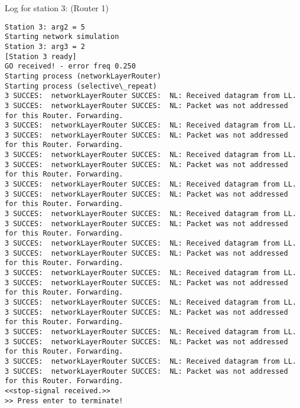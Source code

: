 Log for station 3: (Router 1)
\begin{lstlisting}[breaklines=true]
Station 3: arg2 = 5
Starting network simulation
Station 3: arg3 = 2
[Station 3 ready]
GO received! - error freq 0.250
Starting process (networkLayerRouter)
Starting process (selective\_repeat)
3 SUCCES:  networkLayerRouter SUCCES:  NL: Received datagram from LL.
3 SUCCES:  networkLayerRouter SUCCES:  NL: Packet was not addressed for this Router. Forwarding.
3 SUCCES:  networkLayerRouter SUCCES:  NL: Received datagram from LL.
3 SUCCES:  networkLayerRouter SUCCES:  NL: Packet was not addressed for this Router. Forwarding.
3 SUCCES:  networkLayerRouter SUCCES:  NL: Received datagram from LL.
3 SUCCES:  networkLayerRouter SUCCES:  NL: Packet was not addressed for this Router. Forwarding.
3 SUCCES:  networkLayerRouter SUCCES:  NL: Received datagram from LL.
3 SUCCES:  networkLayerRouter SUCCES:  NL: Packet was not addressed for this Router. Forwarding.
3 SUCCES:  networkLayerRouter SUCCES:  NL: Received datagram from LL.
3 SUCCES:  networkLayerRouter SUCCES:  NL: Packet was not addressed for this Router. Forwarding.
3 SUCCES:  networkLayerRouter SUCCES:  NL: Received datagram from LL.
3 SUCCES:  networkLayerRouter SUCCES:  NL: Packet was not addressed for this Router. Forwarding.
3 SUCCES:  networkLayerRouter SUCCES:  NL: Received datagram from LL.
3 SUCCES:  networkLayerRouter SUCCES:  NL: Packet was not addressed for this Router. Forwarding.
3 SUCCES:  networkLayerRouter SUCCES:  NL: Received datagram from LL.
3 SUCCES:  networkLayerRouter SUCCES:  NL: Packet was not addressed for this Router. Forwarding.
3 SUCCES:  networkLayerRouter SUCCES:  NL: Received datagram from LL.
3 SUCCES:  networkLayerRouter SUCCES:  NL: Packet was not addressed for this Router. Forwarding.
3 SUCCES:  networkLayerRouter SUCCES:  NL: Received datagram from LL.
3 SUCCES:  networkLayerRouter SUCCES:  NL: Packet was not addressed for this Router. Forwarding.
<<stop-signal received.>>
>> Press enter to terminate!
\end{lstlisting}

